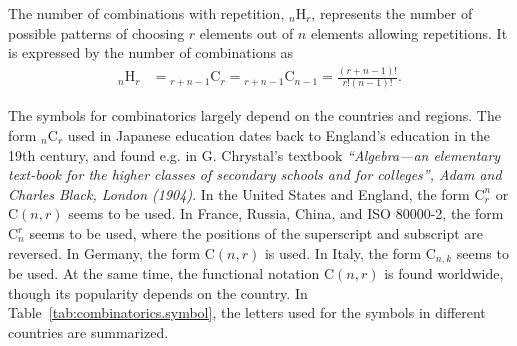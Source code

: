 \documentclass[amsmath,amssymb,prc,aps]{revtex4-2}
\begin{document}
The number of combinations with repetition, $_n\mathrm{H}_r$, represents the
number of possible patterns of choosing $r$ elements out of $n$ elements
allowing repetitions.  It is expressed by the number of combinations as
\begin{align}
  {}_n\mathrm{H}_r &= {}_{r+n-1}\mathrm{C}_r = {}_{r+n-1}\mathrm{C}_{n-1} = \frac{(r+n-1)!}{r!(n-1)!}.
\end{align}

The symbols for combinatorics largely depend on the countries and regions.  The
form $_n\mathrm{C}_r$ used in Japanese education dates back to England's
education in the 19th century, and found e.g. in G. Chrystal's textbook
\textit{``Algebra---an elementary text-book for the higher classes of secondary
schools and for colleges'', Adam and Charles Black, London (1904)}.  In the
United States and England, the form $\mathrm{C}^n_r$ or $\mathrm{C}(n, r)$
seems to be used.  In France, Russia, China, and ISO 80000-2, the form
$\mathrm{C}_n^r$ seems to be used, where the positions of the superscript and
subscript are reversed.  In Germany, the form $\mathrm{C}(n, r)$ is used.  In
Italy, the form $\mathrm{C}_{n,k}$ seems to be used.  At the same time, the
functional notation $\mathrm{C}(n, r)$ is found worldwide, though its
popularity depends on the country. In Table~\ref{tab:combinatorics.symbol}, the
letters used for the symbols in different countries are summarized.
\end{document}
